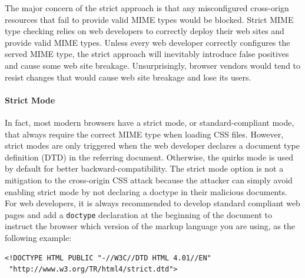 \documentclass{acm_proc_article-sp}
\begin{document}
{The major concern of the strict approach is that any misconfigured cross-orign resources that fail to provide valid MIME types would be blocked. Strict MIME type checking relies on web developers to correctly deploy their web sites and provide valid MIME types. Unless every web developer correctly configures the served MIME type, the strict approach will inevitably introduce false positives and cause some web site breakage. Unsurprisingly, browser vendors would tend to resist changes that would cause web site breakage and lose its users.

\paragraph{Strict Mode}
In fact, most modern browsers have a strict mode, or standard-compliant mode, that always require the correct MIME type when loading CSS files. However, strict modes are only triggered when the web developer declares a document type definition (DTD) in the referring document. Otherwise, the quirks mode is used by default for better backward-compatibility. The strict mode option is not a mitigation to the cross-origin CSS attack because the attacker can simply avoid enabling strict mode by not declaring a doctype in their malicious documents. For web developers, it is always recommended to develop standard compliant web pages and add a \texttt{doctype} declaration at the beginning of the document to instruct the browser which version of the markup language you are using, as the following example:

\begin{verbatim}
<!DOCTYPE HTML PUBLIC "-//W3C//DTD HTML 4.01//EN"
 "http://www.w3.org/TR/html4/strict.dtd">
\end{verbatim}

}
\end{document}
